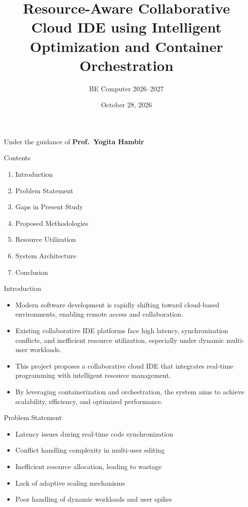 \documentclass[aspectratio=169,11pt]{beamer}
\title[Resource-Aware Collaborative Cloud IDE]{Resource-Aware Collaborative Cloud IDE using Intelligent Optimization and Container Orchestration}
\author{BE Computer 2026--2027}
\institute[AIT]{Army Institute of Technology\\Savitribai Phule Pune University\\Computer Engineering}
\date{October 28, 2026}
\newcommand{\guide}{Prof.\ Yogita Hambir}
\begin{document}
\begin{frame}
  \titlepage
  \vspace{-0.5em}
  \begin{center}
    \small Under the guidance of \textbf{\guide}
  \end{center}
\end{frame}

\begin{frame}{Contents}
  \begin{enumerate}
    \item Introduction
    \item Problem Statement
    \item Gaps in Present Study
    \item Proposed Methodologies
    \item Resource Utilization
    \item System Architecture
    \item Conclusion
  \end{enumerate}
\end{frame}

\begin{frame}{Introduction}
  \begin{itemize}
    \item Modern software development is rapidly shifting toward cloud-based environments, enabling remote access and collaboration.
    \item Existing collaborative IDE platforms face \alert{high latency}, \alert{synchronization conflicts}, and \alert{inefficient resource utilization}, especially under dynamic multi-user workloads.
    \item This project proposes a collaborative cloud IDE that integrates real-time programming with intelligent resource management.
    \item By leveraging containerization and orchestration, the system aims to achieve scalability, efficiency, and optimized performance.
  \end{itemize}
\end{frame}

\begin{frame}{Problem Statement}
  \begin{itemize}
    \setlength{\itemsep}{0.8em}
    \item Latency issues during real-time code synchronization
    \item Conflict handling complexity in multi-user editing
    \item Inefficient resource allocation, leading to wastage
    \item Lack of adaptive scaling mechanisms
    \item Poor handling of dynamic workloads and user spikes
  \end{itemize}
\end{frame}
\end{document}
